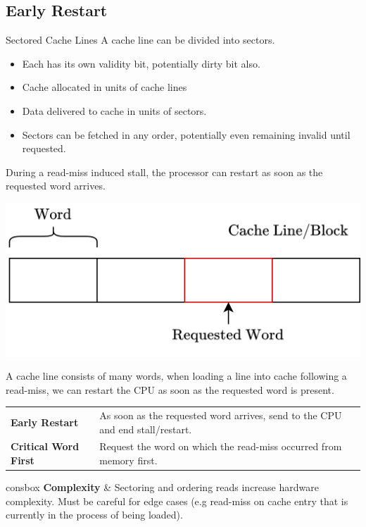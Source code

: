\subsection{Early Restart}
\begin{definitionbox}{Sectored Cache Lines}
    A cache line can be divided into sectors.
    \begin{itemize}
        \item Each has its own validity bit, potentially dirty bit also.
        \item Cache allocated in units of cache lines
        \item Data delivered to cache in units of sectors.
        \item Sectors can be fetched in any order, potentially even remaining invalid until requested.
    \end{itemize}
\end{definitionbox}
During a read-miss induced stall, the processor can restart as soon as the requested word arrives.
\begin{center}
    \includegraphics[width=.7\textwidth]{caches/images/cache_block_critical_word.drawio.png}
\end{center}
A cache line consists of many words, when loading a line into cache following a read-miss, we can restart the CPU as soon as the requested word is present.
\begin{center}
    \begin{tabular}{p{} p{}}
        \textbf{Early Restart} & As soon as the requested word arrives, send to the CPU and end stall/restart. \\
        \textbf{Critical Word First} & Request the word on which the read-miss occurred from memory first. \\
    \end{tabular}
\end{center}
\begin{tabbox}{consbox}
    \textbf{Complexity} & Sectoring and ordering reads increase hardware complexity. Must be careful for edge cases (e.g read-miss on cache entry that is currently in the process of being loaded). \\
\end{tabbox}

